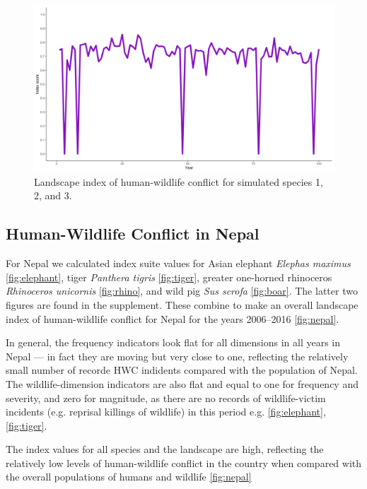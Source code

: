 \documentclass[fleqn,10pt]{olplainarticle}
\begin{document}
\begin{figure}
    \centering
    \includegraphics[width = 1\textwidth]{lsc_ix.png}
    \caption{Landscape index of human-wildlife conflict for simulated species 1, 2, and 3.}
    \label{fig:lsc}
\end{figure}

\subsection*{Human-Wildlife Conflict in Nepal}
For Nepal we calculated index suite values for Asian elephant \emph{Elephas maximus} \ref{fig:elephant}, tiger \emph{Panthera tigris} \ref{fig:tiger}, greater one-horned rhinoceros \emph{Rhinoceros unicornis} \ref{fig:rhino}, and wild pig \emph{Sus scrofa} \ref{fig:boar}. The latter two figures are found in the supplement. These combine to make an overall landscape index of human-wildlife conflict for Nepal for the years 2006--2016 \ref{fig:nepal}.

In general, the frequency indicators look flat for all dimensions in all years in Nepal --- in fact they are moving but very close to one, reflecting the relatively small number of recorde HWC indidents compared with the population of Nepal. The wildlife-dimension indicators are also flat and equal to one for frequency and severity, and zero for magnitude, as there are no records of wildlife-victim incidents (e.g. reprisal killings of wildlife) in this period e.g. \ref{fig:elephant}, \ref{fig:tiger}.

The index values for all species and the landscape are high, reflecting the relatively low levels of human-wildlife conflict in the country when compared with the overall populations of humans and wildlife \ref{fig:nepal} 
\end{document}

